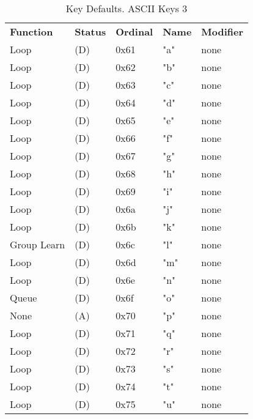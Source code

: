    \begin{table}[htb!]
      \centering
      \caption{Key Defaults. ASCII Keys 3}
      \label{table:key_defaults_ascii_keys_3}
      \begin{tabular}{l l l l l}
        \textbf{Function} & \textbf{Status} & \textbf{Ordinal} & \textbf{Name} & \textbf{Modifier} \\
        Loop               & (D)  &  0x61   & "a"          & none \\
        Loop               & (D)  &  0x62   & "b"          & none \\
        Loop               & (D)  &  0x63   & "c"          & none \\
        Loop               & (D)  &  0x64   & "d"          & none \\
        Loop               & (D)  &  0x65   & "e"          & none \\
        Loop               & (D)  &  0x66   & "f"          & none \\
        Loop               & (D)  &  0x67   & "g"          & none \\
        Loop               & (D)  &  0x68   & "h"          & none \\
        Loop               & (D)  &  0x69   & "i"          & none \\
        Loop               & (D)  &  0x6a   & "j"          & none \\
        Loop               & (D)  &  0x6b   & "k"          & none \\
        Group Learn        & (D)  &  0x6c   & "l"          & none \\
        Loop               & (D)  &  0x6d   & "m"          & none \\
        Loop               & (D)  &  0x6e   & "n"          & none \\
        Queue              & (D)  &  0x6f   & "o"          & none \\
        None               & (A)  &  0x70   & "p"          & none \\
        Loop               & (D)  &  0x71   & "q"          & none \\
        Loop               & (D)  &  0x72   & "r"          & none \\
        Loop               & (D)  &  0x73   & "s"          & none \\
        Loop               & (D)  &  0x74   & "t"          & none \\
        Loop               & (D)  &  0x75   & "u"          & none \\

\end{tabular}
\end{table}
